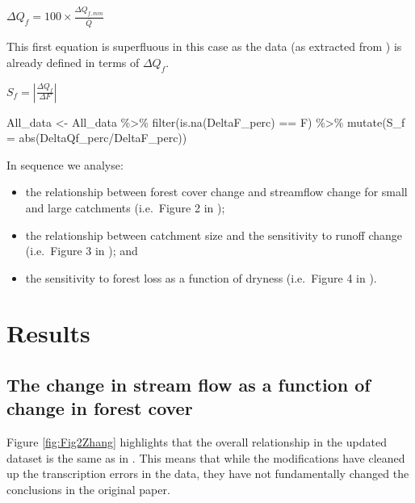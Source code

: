 \documentclass[]{elsarticle} %
\newenvironment{Shaded}{\begin{snugshade}}{\end{snugshade}}
\newcommand{\AttributeTok}[1]{\textcolor[rgb]{0.77,0.63,0.00}{#1}}
\newcommand{\FunctionTok}[1]{\textcolor[rgb]{0.00,0.00,0.00}{#1}}
\newcommand{\NormalTok}[1]{#1}
\newcommand{\OtherTok}[1]{\textcolor[rgb]{0.56,0.35,0.01}{#1}}
\newcommand{\SpecialCharTok}[1]{\textcolor[rgb]{0.00,0.00,0.00}{#1}}
\providecommand{\tightlist}{%
  \setlength{\itemsep}{0pt}\setlength{\parskip}{0pt}}
\begin{document}
\(\Delta Q_f = 100 \times \frac{\Delta Q_{f,mm}}{\bar{Q}}\)

This first equation is superfluous in this case as the data (as extracted from \citet{zhang2017}) is already defined in terms of \(\Delta Q_f\).

\(S_f = |\frac{\Delta Q_f}{\Delta F}|\)

\begin{Shaded}
\begin{Highlighting}[]
\NormalTok{All\_data }\OtherTok{\textless{}{-}}\NormalTok{ All\_data }\SpecialCharTok{\%\textgreater{}\%}
  \FunctionTok{filter}\NormalTok{(}\FunctionTok{is.na}\NormalTok{(DeltaF\_perc) }\SpecialCharTok{==}\NormalTok{ F) }\SpecialCharTok{\%\textgreater{}\%}
  \FunctionTok{mutate}\NormalTok{(}\AttributeTok{S\_f =} \FunctionTok{abs}\NormalTok{(DeltaQf\_perc}\SpecialCharTok{/}\NormalTok{DeltaF\_perc))}
\end{Highlighting}
\end{Shaded}

In sequence we analyse:

\begin{itemize}
\tightlist
\item
  the relationship between forest cover change and streamflow change for small and large catchments (i.e.~Figure 2 in \citet{zhang2017});\\
\item
  the relationship between catchment size and the sensitivity to runoff change (i.e.~Figure 3 in \citet{zhang2017}); and\\
\item
  the sensitivity to forest loss as a function of dryness (i.e.~Figure 4 in \citet{zhang2017}).
\end{itemize}

\hypertarget{results}{%
\section{Results}\label{results}}

\hypertarget{the-change-in-stream-flow-as-a-function-of-change-in-forest-cover}{%
\subsection{The change in stream flow as a function of change in forest cover}\label{the-change-in-stream-flow-as-a-function-of-change-in-forest-cover}}

Figure \ref{fig:Fig2Zhang} highlights that the overall relationship in the updated dataset is the same as in \citet{zhang2017}. This means that while the modifications have cleaned up the transcription errors in the data, they have not fundamentally changed the conclusions in the original paper.
\end{document}
